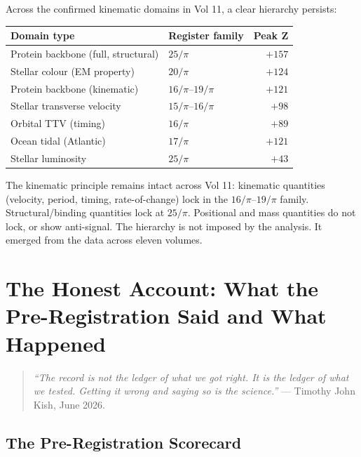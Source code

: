 \documentclass[11pt, letterpaper, openany]{book}
\begin{document}
\begin{empiricalbox}
Across the confirmed kinematic domains in Vol 11, a clear hierarchy persists:

\begin{center}
\begin{tabular}{|l|l|r|}
\hline
\rowcolor{kishblue!10}
\textbf{Domain type} & \textbf{Register family} & \textbf{Peak Z} \\
\hline\hline
Protein backbone (full, structural)  & $25/\pi$     & $+157$ \\
Stellar colour (EM property)         & $20/\pi$     & $+124$ \\
Protein backbone (kinematic)         & $16/\pi$--$19/\pi$ & $+121$ \\
Stellar transverse velocity          & $15/\pi$--$16/\pi$ & $+98$ \\
Orbital TTV (timing)                 & $16/\pi$     & $+89$ \\
Ocean tidal (Atlantic)               & $17/\pi$     & $+121$ \\
Stellar luminosity                   & $25/\pi$     & $+43$ \\
\hline
\end{tabular}
\end{center}

The kinematic principle remains intact across Vol 11: kinematic quantities
(velocity, period, timing, rate-of-change) lock in the $16/\pi$--$19/\pi$
family. Structural/binding quantities lock at $25/\pi$. Positional and mass
quantities do not lock, or show anti-signal. The hierarchy is not imposed
by the analysis. It emerged from the data across eleven volumes.

\clearpage

\chapter{The Honest Account: What the Pre-Registration Said and What Happened}

\begin{quote}
\textit{``The record is not the ledger of what we got right. It is the ledger of
what we tested. Getting it wrong and saying so is the science.''} ---
Timothy John Kish, June 2026.
\end{quote}

\section{The Pre-Registration Scorecard}


\end{empiricalbox}
\end{document}
